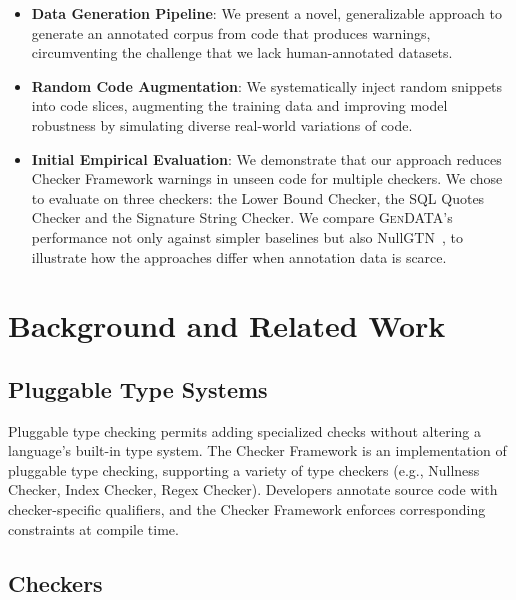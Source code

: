 \documentclass[acmsmall,screen,review,anonymous]{acmart}
\newcommand{\gendata}{\textsc{GenDATA}\xspace}
\newcommand{\cf}{Checker Framework\xspace}
\begin{document}
\begin{itemize}
    \item \textbf{Data Generation Pipeline}: We present a novel, generalizable approach to generate an annotated corpus from code that produces warnings, circumventing the challenge that we lack human-annotated datasets.
    
    \item \textbf{Random Code Augmentation}: We systematically inject random snippets into code slices, augmenting the training data and improving model robustness by simulating diverse real-world variations of code.
    
    \item \textbf{Initial Empirical Evaluation}: We demonstrate that our approach reduces \cf warnings in unseen code for multiple checkers. We chose to evaluate on three checkers: the Lower Bound Checker, the SQL Quotes Checker and the Signature String Checker. We compare \gendata's performance not only against simpler baselines but also NullGTN~\cite{siddiqui2024inferring}, to illustrate how the approaches differ when annotation data is scarce.
\end{itemize}

\section{Background and Related Work}
\label{sec:background}

\subsection{Pluggable Type Systems}
\label{sec:pluggable}

Pluggable type checking permits adding specialized checks without altering a language's built-in type system. The \cf is an implementation of pluggable type checking, supporting a variety of type checkers (e.g., Nullness Checker, Index Checker, Regex Checker). Developers annotate source code with checker-specific qualifiers, and the \cf enforces corresponding constraints at compile time.

\subsection{Checkers}
\label{sec:checkers}
\end{document}
